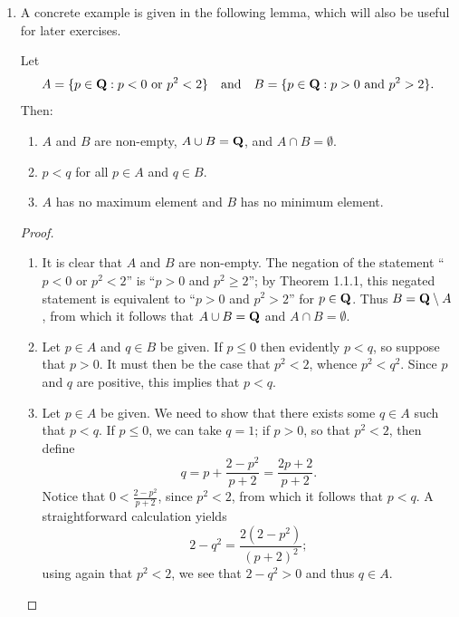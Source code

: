 \documentclass{lew98_solutions}
\begin{document}
\begin{solution}
\begin{enumerate}
        \item A concrete example is given in the following lemma, which will also be useful for later exercises.
        \begin{lemma}
        \label{lem:ex1.3.10}
            Let
            \[
                A = \{ p \in \mathbf{Q} : p < 0 \text{ or } p^2 < 2 \} \quad \text{and} \quad B = \{ p \in \mathbf{Q} : p > 0 \text{ and } p^2 > 2 \}.
            \]
            Then:
            \begin{enumerate}[label=(\roman*)]
                \item \( A \) and \( B \) are non-empty, \( A \cup B = \mathbf{Q} \), and \( A \cap B = \emptyset \).

                \item \( p < q \) for all \( p \in A \) and \( q \in B \).

                \item \( A \) has no maximum element and \( B \) has no minimum element.
            \end{enumerate}
        \end{lemma}

        \begin{proof}
            \begin{enumerate}[label=(\roman*)]
                \item It is clear that \( A \) and \( B \) are non-empty. The negation of the statement ``\( p < 0 \) or \( p^2 < 2 \)'' is ``\( p > 0 \) and \( p^2 \geq 2 \)''; by Theorem 1.1.1, this negated statement is equivalent to ``\( p > 0 \) and \( p^2 > 2 \)'' for \( p \in \mathbf{Q} \). Thus \( B = \mathbf{Q} \setminus A \), from which it follows that \( A \cup B = \mathbf{Q} \) and \( A \cap B = \emptyset \).

                \item Let \( p \in A \) and \( q \in B \) be given. If \( p \leq 0 \) then evidently \( p < q \), so suppose that \( p > 0 \). It must then be the case that \( p^2 < 2 \), whence \( p^2 < q^2 \). Since \( p \) and \( q \) are positive, this implies that \( p < q \).

                \item Let \( p \in A \) be given. We need to show that there exists some \( q \in A \) such that \( p < q \). If \( p \leq 0 \), we can take \( q = 1 \); if \( p > 0 \), so that \( p^2 < 2 \), then define
                \[
                    q = p + \frac{2 - p^2}{p + 2} = \frac{2p + 2}{p + 2}. \tag{1}
                \]
                Notice that \( 0 < \tfrac{2 - p^2}{p + 2} \), since \( p^2 < 2 \), from which it follows that \( p < q \). A straightforward calculation yields
                \[
                    2 - q^2 = \frac{2(2 - p^2)}{(p + 2)^2};
                \]
                using again that \( p^2 < 2 \), we see that \( 2 - q^2 > 0 \) and thus \( q \in A \).


\end{enumerate}
\end{proof}
\end{enumerate}
\end{solution}
\end{document}
